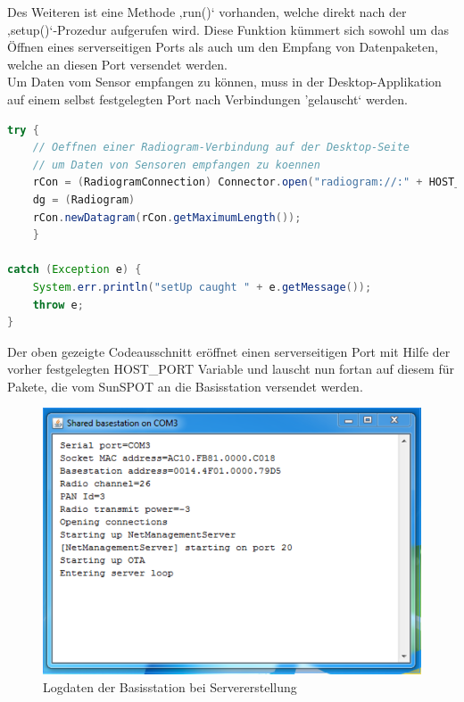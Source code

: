 Des Weiteren ist eine Methode ‚run()‘ vorhanden, welche direkt nach der ‚setup()‘-Prozedur aufgerufen wird. Diese Funktion kümmert sich sowohl um das Öffnen eines serverseitigen Ports als auch um den Empfang von Datenpaketen, welche an diesen Port versendet werden. \\
Um Daten vom Sensor empfangen zu können, muss in der Desktop-Applikation auf einem selbst festgelegten Port nach Verbindungen 'gelauscht‘ werden. 
\\
\begin{lstlisting}[language=Java,caption={Öffnen des serverseitigen Ports},label=lst:portserver,frame=single] 
try {
	// Oeffnen einer Radiogram-Verbindung auf der Desktop-Seite
	// um Daten von Sensoren empfangen zu koennen
	rCon = (RadiogramConnection) Connector.open("radiogram://:" + HOST_PORT);
	dg = (Radiogram)
	rCon.newDatagram(rCon.getMaximumLength());
	} 
	
catch (Exception e) {
	System.err.println("setUp caught " + e.getMessage());
	throw e;
}
\end{lstlisting}

Der oben gezeigte Codeausschnitt eröffnet einen serverseitigen Port mit Hilfe der vorher festgelegten HOST\_PORT Variable und lauscht nun fortan auf diesem für Pakete, die vom SunSPOT an die Basisstation versendet werden.\\

\begin{figure}[H] 
	\centering
	\includegraphics[scale=0.7]{Bilder/server}
	\caption{Logdaten der Basisstation bei Servererstellung}
	\label{f:server}
\end{figure}

